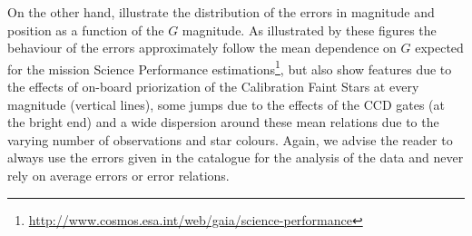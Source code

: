 On the other hand, 
illustrate the distribution of the errors in magnitude and position as a function of the $G$ magnitude. As illustrated by these figures the behaviour of the errors approximately follow the mean dependence on $G$ expected for the mission Science Performance estimations\footnote{\scriptsize\url{http://www.cosmos.esa.int/web/gaia/science-performance}}, but also show features due to the effects of on-board priorization of the Calibration Faint Stars at every magnitude (vertical lines), some jumps due to the effects of the CCD gates (at the bright end) and a wide dispersion around these mean relations due to the varying number of observations and star colours. Again, we advise the reader to always use the errors given in the catalogue for the analysis of the data and never rely on average errors or error relations.




	

%	

%


